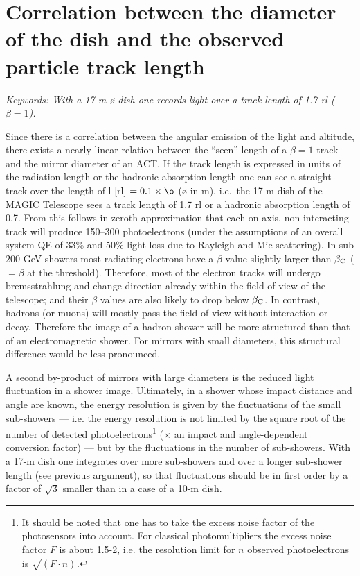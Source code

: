\section{Correlation between the diameter of the dish 
and the observed particle track length}
\par\medskip 
{\it Keywords: With a 17 m {\o} 
dish one records \Cerenkov light over a 
track length of 1.7 rl ($\beta = 1$).}

\par\medskip Since there is a
correlation between the angular emission of the 
\Cerenkov light and altitude, there exists 
a nearly linear relation between the ``seen'' length of 
a $\beta = 1$ track and the mirror diameter of an 
ACT. If the track length is expressed in units of the
radiation length or the hadronic 
absorption length one can see a straight track over 
the length of l [rl] $= 0.1 \times \o$ ({\o} in m), 
i.e.\ the 17-m dish of the MAGIC Telescope sees a track length of 1.7 rl 
or a  hadronic 
absorption length of 0.7. From this follows in zeroth approximation
that each on-axis, non-interacting 
track will produce 150--300 photoelectrons 
(under the assumptions of an overall
system QE of 33\% and 50\% light loss 
due to Rayleigh and Mie scattering). In sub 200 GeV 
showers most radiating electrons have a 
$\beta$ value slightly larger than
$\beta_{\rm C}$ ($= \beta$ at the \Cerenkov threshold).
Therefore, most of the electron tracks will 
undergo bremsstrahlung and change direction already 
within the field of view of the telescope; 
and their $\beta$ values 
are also likely to drop below $\beta_{\rm C}$. In contrast, 
hadrons (or muons) will mostly pass the 
field of view without interaction or decay. Therefore
the image of a hadron shower will be 
more structured than that of an electromagnetic shower.
For mirrors with small diameters, this 
structural difference would be less pronounced.

A second by-product of mirrors with large diameters is the
reduced light fluctuation in a shower 
image. Ultimately, in a shower whose impact distance
and angle  are known, the energy resolution is 
given by the fluctuations of the small sub-showers --- i.e.
the energy resolution is not limited by 
the square root of the number of detected 
photoelectrons\footnote{It should be noted that one has to take the excess 
noise factor of the photosensors into 
account. For classical photomultipliers the excess noise
factor $F$ is about 1.5-2, i.e. the 
resolution limit for $n$ observed photoelectrons is $\sqrt{(F \cdot n)}$.} 
($\times$ an impact and angle-dependent conversion factor) 
---  but by the fluctuations in the
number of sub-showers. With a 17-m
dish one integrates over more sub-showers and over a
longer sub-shower length (see 
previous argument), so that fluctuations should be in
first order by a factor of $\sqrt{3}$ smaller than in 
a case of a 10-m dish.

